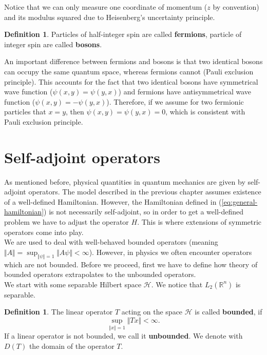 \documentclass[11pt, a4paper, german]{article}
\theoremstyle{plain}
\theoremstyle{definition}
\newtheorem{definition}[theorem]{Definition}
\theoremstyle{remark}
\numberwithin{equation}{section}
\numberwithin{theorem}{section}
\begin{document}
Notice that we can only measure one coordinate of momentum ($z$ by convention) and its modulus squared due to Heisenberg's uncertainty principle.

\begin{definition}
Particles of half-integer spin are called \textbf{fermions}, particle of integer spin are called \textbf{bosons}.
\end{definition}

An important difference between fermions and bosons is that two identical bosons can occupy the same quantum space, whereas fermions cannot (Pauli exclusion principle). This accounts for the fact that two identical bosons have symmetrical wave function ($\psi(x, y) = \psi(y, x)$) and fermions have antisymmetrical wave function ($\psi(x, y) = -\psi(y, x)$). Therefore, if we assume for two fermionic particles that $x=y$, then $\psi(x,y)=\psi(y,x)=0$, which is consistent with Pauli exclusion principle.\\

\section{Self-adjoint operators}\label{sec:self-adjoint-operators}

As mentioned before, physical quantities in quantum mechanics are given by self-adjoint operators. The model described in the previous chapter assumes existence of a well-defined Hamiltonian. However, the Hamiltonian defined in (\ref{eq:general-hamiltonian}) is not necessarily self-adjoint, so in order to get a well-defined problem we have to adjust the operator $H$. This is where extensions of symmetric operators come into play.\\

We are used to deal with well-behaved bounded operators (meaning $\Vert A\Vert = \sup_{\Vert \psi \Vert = 1} \Vert A \psi \Vert < \infty$). However, in physics we often encounter operators which are not bounded. Before we proceed, first we have to define how theory of bounded operators extrapolates to the unbounded operators. \\

We start with some separable Hilbert space $\mathcal{H}$. We notice that $L_2(\mathbb R ^n)$ is separable.

\begin{definition} The linear operator $T$ acting on the space $\mathcal{H}$ is called \textbf{bounded}, if $$\sup_{\Vert x \Vert = 1}  \Vert Tx \Vert < \infty.$$ If a linear operator is not bounded, we call it \textbf{unbounded}. We denote with $D(T)$ the domain of the operator $T$.
\end{definition}
\end{document}
